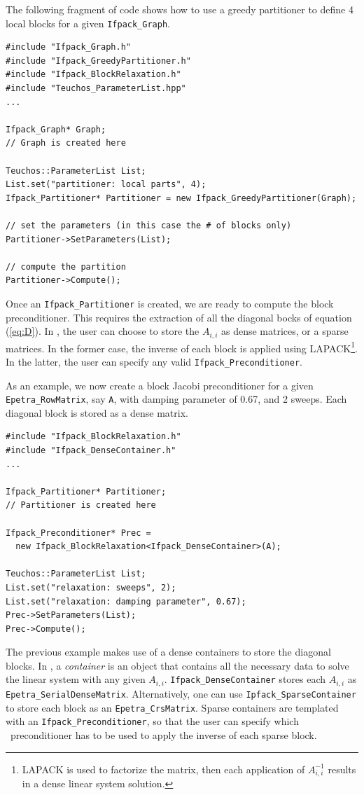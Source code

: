 The following fragment of code shows how to use a greedy partitioner to define
4 local blocks for a given \verb!Ifpack_Graph!.

\begin{verbatim}
#include "Ifpack_Graph.h"
#include "Ifpack_GreedyPartitioner.h"
#include "Ifpack_BlockRelaxation.h"
#include "Teuchos_ParameterList.hpp"
...

Ifpack_Graph* Graph;   
// Graph is created here

Teuchos::ParameterList List;
List.set("partitioner: local parts", 4);
Ifpack_Partitioner* Partitioner = new Ifpack_GreedyPartitioner(Graph);

// set the parameters (in this case the # of blocks only)
Partitioner->SetParameters(List);

// compute the partition
Partitioner->Compute();
\end{verbatim}

Once an \verb!Ifpack_Partitioner! is created, we are ready to
compute the block preconditioner. This requires the extraction of
all the diagonal bocks of equation (\ref{eq:D}). In \ifpack, the
user can choose to store the $A_{i,i}$ as dense matrices, or a sparse
matrices. In the former case, the inverse of each block is applied using
LAPACK\footnote{LAPACK is used to factorize the matrix, then each application
  of $A_{i,i}^{-1}$ results in a dense linear system solution.}. In the
  latter, the user can specify any valid \verb!Ifpack_Preconditioner!.

As an example, we now create a block Jacobi preconditioner for 
a given \verb!Epetra_RowMatrix!, say \verb!A!,
with damping parameter of 0.67, and 2 sweeps. Each diagonal block is stored as a dense
matrix.

\begin{verbatim}
#include "Ifpack_BlockRelaxation.h"
#include "Ifpack_DenseContainer.h"
...

Ifpack_Partitioner* Partitioner;
// Partitioner is created here

Ifpack_Preconditioner* Prec =
  new Ifpack_BlockRelaxation<Ifpack_DenseContainer>(A);

Teuchos::ParameterList List;
List.set("relaxation: sweeps", 2);
List.set("relaxation: damping parameter", 0.67);
Prec->SetParameters(List);
Prec->Compute();
\end{verbatim}
The previous example makes use of a dense containers to store
the diagonal blocks.
In \ifpack, a {\sl container} is an object that contains all the necessary
data to solve the linear system with any given $A_{i,i}$. 
\verb!Ifpack_DenseContainer! stores each $A_{i,i}$ as
\verb!Epetra_SerialDenseMatrix!. Alternatively, one can use 
\verb!Ipfack_SparseContainer! to store each block as an
\verb!Epetra_CrsMatrix!. Sparse containers are templated with an
\verb!Ifpack_Preconditioner!, so that the user can specify which \ifpack\
  preconditioner has to be used to apply the inverse of each sparse block.

